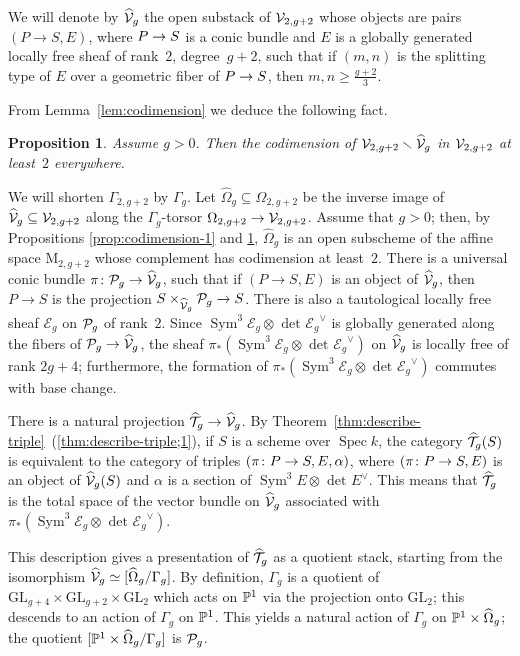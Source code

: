 \documentclass{amsart}
\numberwithin{equation}{section}
\numberwithin{subsection}{section}
\newtheorem{proposition}[theorem]{Proposition}
\theoremstyle{definition}
\theoremstyle{remark}
\newcommand\refall[2]{\ref{#1}~(\ref{#1;#2})}
\newcommand\cE{\mathcal{E}} \newcommand\cF{\mathcal{F}}
\newcommand\rM{\mathrm{M}} \newcommand\rN{\mathrm{N}}
\newcommand\arr{\ifinner\to\else\longrightarrow\fi}
\newcommand\spec{\operatorname{Spec}}
\renewcommand{\setminus}{\smallsetminus}
\newcommand{\OT}[1][g]{\widehat{\cT}_{#1}}
\newcommand{\pone}{\PP^{1}}
\newcommand{\GL}{\mathrm{GL}}
\newcommand{\sym}{\operatorname{Sym}}
\newcommand{\symthree}[2][]{\sym^{3}_{{#1}}{#2} \otimes_{{#1}} \det\nolimits_{{#1}} {#2}\dual}
\newcommand{\dual}{^{\vee}}
\begin{document}
We will denote by $\widehat{\mathcal{V}}_{g}$ the open substack of $\mathcal{V}_{2, g+2}$ whose objects are pairs $(P \to S, E)$, where $P \arr S$ is a conic bundle and $E$ is a globally generated locally free sheaf of rank~$2$, degree~$g+2$, such that if $(m, n)$ is the splitting type of $E$ over a geometric fiber of $P \arr S$, then $m, n \geq \frac{g+2}{3}$.

From Lemma~\ref{lem:codimension} we deduce the following fact.

\begin{proposition}\label{prop:codimension-2}
Assume $g > 0$. Then the codimension of $\cV_{2, g+2} \setminus \widehat{\cV}_{g}$ in $\mathcal{V}_{2, g+2}$ at least~$2$ everywhere.
\end{proposition}


We will shorten $\Gamma_{2,g+2}$ by $\Gamma_{g}$. Let $\widehat{\Omega}_{g} \subseteq \Omega_{2,g+2}$ be the inverse image of $\widehat{\mathcal{V}}_{g} \subseteq \mathcal{V}_{2,g+2}$ along the $\Gamma_{g}$-torsor $\Omega_{2,g+2} \arr \cV_{2,g+2}$. Assume that $g > 0$; then, by Propositions \ref{prop:codimension-1} and \ref{prop:codimension-2}, $\widehat{\Omega}_{g}$ is an open subscheme of the affine space $\rM_{2,g+2}$ whose complement has codimension at least~$2$. There is a universal conic bundle $\pi\colon \cP_{g} \arr \widehat{\cV}_{g}$, such that if $(P \to S, E)$ is an object of $\widehat{\mathcal{V}}_{g}$, then $P \to S$ is the projection $S \times_{\widehat{\cV}_{g}} \cP_{g} \arr S$. There is also a tautological locally free sheaf $\cE_{g}$ on $\mathcal{P}_{g}$ of rank~$2$. Since $\symthree {\cE_{g}}$ is globally generated along the fibers of $\cP_{g} \arr \widehat{\cV}_{g}$, the sheaf $\pi_{*}(\symthree {\cE_{g}})$ on $\widehat{\mathcal{V}}_{g}$ is locally free of rank $2g+4$; furthermore, the formation of $\pi_{*}(\symthree {\cE_{g}})$ commutes with base change.

There is a natural projection $\OT \arr \widehat{\cV}_{g}$. By Theorem~\refall{thm:describe-triple}{1}, if $S$ is a scheme over $\spec k$, the category $\OT(S)$ is equivalent to the category of triples $(\pi\colon P \arr S, E, \alpha)$, where $(\pi\colon P \arr S, E)$ is an object of $\widehat{\mathcal{V}}_{g}(S)$ and $\alpha$ is a section of $\symthree E$. This means that $\OT$ is the total space of the vector bundle on $\widehat{\mathcal{V}}_{g}$ associated with $\pi_{*}(\symthree {\cE_{g}})$.

This description gives a presentation of $\OT$ as a quotient stack, starting from the isomorphism $\widehat{\mathcal{V}}_{g} \simeq [\widehat{\Omega}_{g}/\Gamma_{g}]$. By definition, $\Gamma_{g}$ is a quotient of  $\GL_{g+4} \times \GL_{g+2} \times \GL_{2}$
which acts on $\pone$ via the projection onto $\GL_{2}$; this descends to an action of $\Gamma_{g}$ on $\pone$. This yields a natural action of $\Gamma_{g}$ on $\pone \times \widehat{\Omega}_{g}$; the quotient $[\pone \times \widehat{\Omega}_{g}/\Gamma_{g}]$ is $\mathcal{P}_{g}$.
\end{document}
